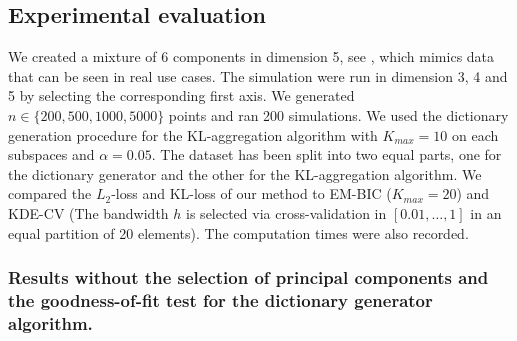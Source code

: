\subsection{Experimental evaluation}

We created a mixture of 6 components in dimension 5, see , which mimics data that can be seen in real use cases. The simulation were run in dimension 3, 4 and 5 by selecting the corresponding first axis. We generated $n\in\{200, 500, 1000, 5000\}$ points and ran 200 simulations. We used the dictionary generation procedure for the KL-aggregation algorithm with $K_{max} = 10$ on each subspaces and $\alpha=0.05$. The dataset has been split into two equal parts, one for the dictionary generator and the other for the KL-aggregation algorithm. We compared the $L_2$-loss and KL-loss of our method to EM-BIC ($K_{max} = 20$) and KDE-CV (The bandwidth $h$ is selected via cross-validation in $[0.01, \dots, 1]$ in an equal partition of 20 elements). The computation times were also recorded. 

\subsubsection{ Results without the selection of principal components and the goodness-of-fit test for the dictionary generator algorithm.}

